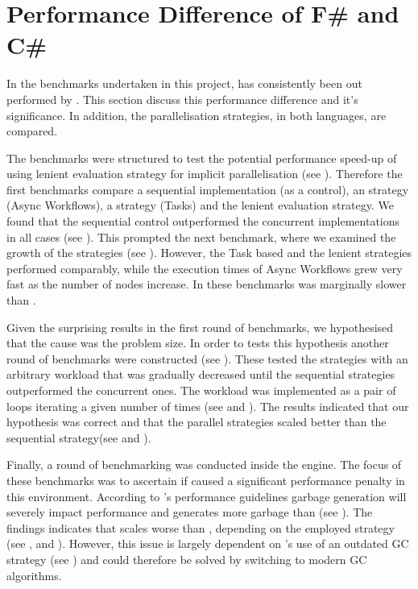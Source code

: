 \section{Performance Difference of F\# and C\#}\label{sec:perf-diff}
In the benchmarks undertaken in this project, \fs has consistently been out performed by \cs. This section discuss this performance difference and it's significance. In addition, the parallelisation strategies, in both languages, are compared.

The benchmarks were structured to test the potential performance speed-up of using lenient evaluation strategy for implicit parallelisation (see ). Therefore the first benchmarks compare a sequential implementation (as a control), an \fs strategy (Async Workflows), a \cs strategy (Tasks) and the lenient evaluation strategy. We found that the sequential control outperformed the concurrent implementations in all cases (see ). This prompted the next benchmark, where we examined the growth of the strategies (see ). However, the Task based and the lenient strategies performed comparably, while the execution times of Async Workflows grew very fast as the number of nodes increase. In these benchmarks \fs was marginally slower than \cs.

Given the surprising results in the first round of benchmarks, we hypothesised that the cause was the problem size. In order to tests this hypothesis another round of benchmarks were constructed (see ). These tested the strategies with an arbitrary workload that was gradually decreased until the sequential strategies outperformed the concurrent ones. The workload was implemented as a pair of  loops iterating a given number of times (see  and ). The results indicated that our hypothesis was correct and that the parallel strategies scaled better than the sequential strategy(see  and ).

Finally, a round of benchmarking was conducted inside the \unity engine. The focus of these benchmarks was to ascertain if \fs caused a significant performance penalty in this environment. According to \unity's performance guidelines garbage generation will severely impact performance and \fs generates more garbage than \cs (see )\cite{normark2008mapping, unity:fsharp}. The findings indicates that \fs scales worse than \cs, depending on the employed strategy (see ,  and ). However, this issue is largely dependent on \unity's use of an outdated \gls{GC} strategy (see ) and could therefore be solved by switching to modern \gls{GC} algorithms.

